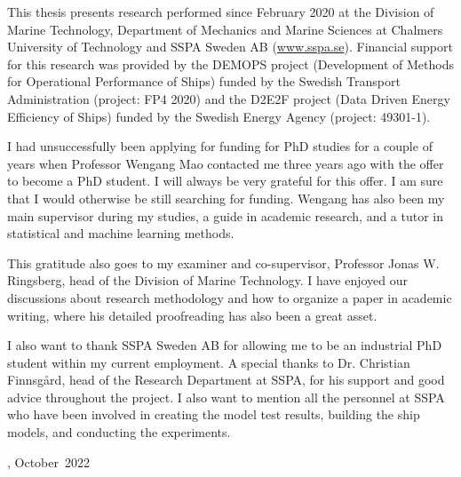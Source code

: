 This thesis presents research performed since February 2020 at the Division of Marine Technology, Department of Mechanics and Marine Sciences at Chalmers University of Technology and SSPA Sweden AB (\href{www.sspa.se}{www.sspa.se}). Financial support for this research was provided by the DEMOPS project (Development of Methods for Operational Performance of Ships) funded by the Swedish Transport Administration (project: FP4 2020) and the D2E2F project (Data Driven Energy Efficiency of Ships) funded by the Swedish Energy Agency (project: 49301-1).

I had unsuccessfully been applying for funding for PhD studies for a couple of years when Professor Wengang Mao contacted me three years ago with the offer to become a PhD student. I will always be very grateful for this offer. I am sure that I would otherwise be still searching for funding. Wengang has also been my main supervisor during my studies, a guide in academic research, and a tutor in statistical and machine learning methods.  

This gratitude also goes to my examiner and co-supervisor, Professor Jonas W. Ringsberg,
head of the Division of Marine Technology. I have enjoyed our discussions about research methodology and how to organize a paper in academic writing, where his detailed proofreading has also been a great asset.

I also want to thank SSPA Sweden AB for allowing me to be an industrial PhD student within my current employment. A special thanks to Dr. Christian Finnsgård, head of the Research Department at SSPA, for his support and good advice throughout the project. I also want to mention all the personnel at SSPA who have been involved in creating the model test results, building the ship models, and conducting the experiments.

\vskip 2pc

\noindent \thesisauthor

\noindent \thesiscity, October\  2022  %
